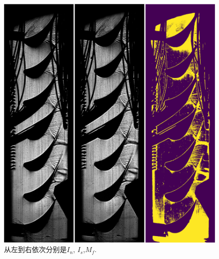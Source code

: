 \begin{figure}[t]
	\begin{center}
		\includegraphics[width=0.75\linewidth]{src/Mf}
	\end{center}
	\caption{ 从左到右依次分别是$I_n$, $I_s$,$M_f$.}
	\label{fig:Mf}	
\end{figure}